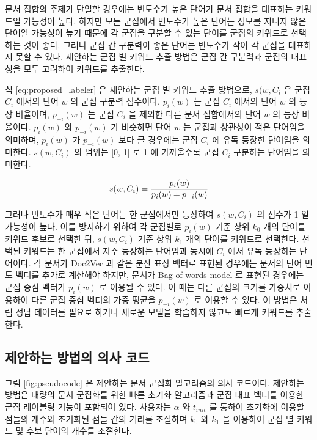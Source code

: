 \documentclass[oneside, ko,phd]{snuthesis_utf8_kor}
\begin{document}
문서 집합의 주제가 단일할 경우에는 빈도수가 높은 단어가 문서 집합을 대표하는 키워드일 가능성이 높다.
하지만 모든 군집에서 빈도수가 높은 단어는 정보를 지니지 않은 단어일 가능성이 높기 때문에 각 군집을 구분할 수 있는 단어를 군집의 키워드로 선택하는 것이 좋다.
그러나 군집 간 구분력이 좋은 단어는 빈도수가 작아 각 군집을 대표하지 못할 수 있다.
제안하는 군집 별 키워드 추출 방법은 군집 간 구분력과 군집의 대표성을 모두 고려하여 키워드를 추출한다.

식 \ref{eq:proposed_labeler} 은 제안하는 군집 별 키워드 추출 방법으로, $s(w, C_i$ 은 군집 $C_i$ 에서의 단어 $w$ 의 군집 구분력 점수이다.
$p_i (w)$ 는 군집 $C_i$ 에서의 단어 $w$ 의 등장 비율이며, $p_{-i} (w)$ 는 군집 $C_i$ 을 제외한 다른 문서 집합에서의 단어 $w$ 의 등장 비율이다.
$p_i (w)$ 와 $p_{-i} (w)$ 가 비슷하면 단어 $w$ 는 군집과 상관성이 적은 단어임을 의미하며, $p_i (w)$ 가 $p_{-i} (w)$ 보다 클 경우에는 군집 $C_i$ 에 유독 등장한 단어임을 의미한다.
$s(w, C_i)$ 의 범위는 [0, 1] 로 1 에 가까울수록 군집 $C_i$ 구분하는 단어임을 의미한다.

\begin{equation}
\label{eq:proposed_labeler}
\centering
s(w, C_i) = \frac{p_i (w)}{p_i (w) + p_{-i}(w)}
\end{equation}

그러나 빈도수가 매우 작은 단어는 한 군집에서만 등장하여 $s(w, C_i)$ 의 점수가 1 일 가능성이 높다.
이를 방지하기 위하여 각 군집별로 $p_i (w)$ 기준 상위 $k_0$ 개의 단어를 키워드 후보로 선택한 뒤, $s(w, C_i)$ 기준 상위 $k_1$ 개의 단어를 키워드로 선택한다.
선택된 키워드는 한 군집에서 자주 등장하는 단어임과 동시에 $C_i$ 에서 유독 등장하는 단어이다.
각 문서가 Doc2Vec 과 같은 분산 표상 벡터로 표현된 경우에는 문서의 단어 빈도 벡터를 추가로 계산해야 하지만, 문서가 Bag-of-words model 로 표현된 경우에는 군집 중심 벡터가 $p_i (w)$ 로 이용될 수 있다.
이 때는 다른 군집의 크기를 가중치로 이용하여 다른 군집 중심 벡터의 가중 평균을 $p_{-i}(w)$ 로 이용할 수 있다.
이 방법은 \cite{zhang2006keyword, onan2016ensemble} 처럼 정답 데이터를 필요로 하거나 새로운 모델을 학습하지 않고도 빠르게 키워드를 추출한다.


\subsection{제안하는 방법의 의사 코드}

그림 \ref{fig:pseudocode} 은 제안하는 문서 군집화 알고리즘의 의사 코드이다.
제안하는 방법은 대량의 문서 군집화를 위한 빠른 초기화 알고리즘과 군집 대표 벡터를 이용한 군집 레이블링 기능이 포함되어 있다.
사용자는 $\alpha$ 와 $t_{init}$ 를 통하여 초기화에 이용할 점들의 개수와 초기화된 점들 간의 거리를 조절하며 $k_0$ 와 $k_1$ 을 이용하여 군집 별 키워드 및 후보 단어의 개수를 조절한다.
\end{document}
